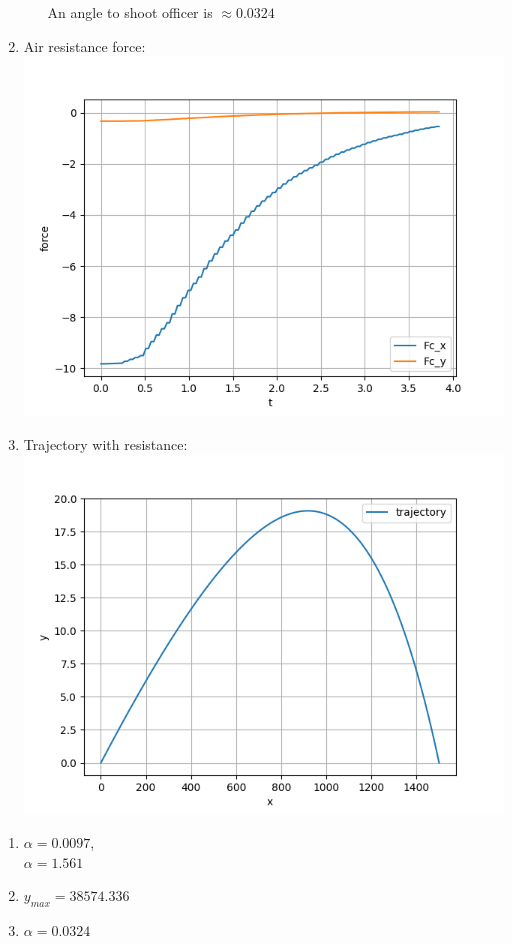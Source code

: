 \begin{enumerate}
\begin{enumerate}
                    An angle to shoot officer is $\approx 0.0324$
          \end{enumerate}
    \item Air resistance force: \\
          \includegraphics[width=\linewidth]{task1force.png}
    \item Trajectory with resistance: \\
          \includegraphics[width=\linewidth]{trajectory.png}
\end{enumerate}

\begin{answer}
    \begin{enumerate}
        \item
              $\alpha = 0.0097$, \\
              $\alpha = 1.561$
        \item
              $y_{max} = 38574.336$
        \item
              $\alpha = 0.0324$
    \end{enumerate}
\end{answer}